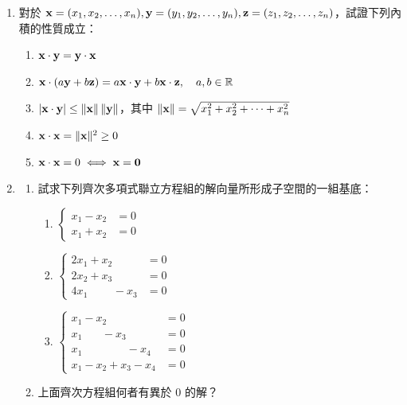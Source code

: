 \begin{enumerate}[label=\arabic*., leftmargin=2em]
  \item[\textbf{**9.}] 對於 $\boldsymbol{\mathbf{x}}=(x_1, x_2, \dots, x_n), \boldsymbol{\mathbf{y}}=(y_1, y_2, \dots, y_n), \boldsymbol{\mathbf{z}}=(z_1, z_2, \dots, z_n)$，試證下列內積的性質成立：
  \begin{enumerate}[label=(\roman*)]
    \item $\boldsymbol{\mathbf{x}} \cdot \boldsymbol{\mathbf{y}} = \boldsymbol{\mathbf{y}} \cdot \boldsymbol{\mathbf{x}}$
    \item $\boldsymbol{\mathbf{x}} \cdot (a\boldsymbol{\mathbf{y}} + b\boldsymbol{\mathbf{z}}) = a\boldsymbol{\mathbf{x}} \cdot \boldsymbol{\mathbf{y}} + b\boldsymbol{\mathbf{x}} \cdot \boldsymbol{\mathbf{z}}, \quad a, b \in \mathbb{R}$
    \item $|\boldsymbol{\mathbf{x}} \cdot \boldsymbol{\mathbf{y}}| \le \|\boldsymbol{\mathbf{x}}\| \, \|\boldsymbol{\mathbf{y}}\|$，其中 $\|\boldsymbol{\mathbf{x}}\| = \sqrt{x_1^2 + x_2^2 + \dots + x_n^2}$
    \item $\boldsymbol{\mathbf{x}} \cdot \boldsymbol{\mathbf{x}} = \|\boldsymbol{\mathbf{x}}\|^2 \ge 0$
    \item $\boldsymbol{\mathbf{x}} \cdot \boldsymbol{\mathbf{x}} = 0 \iff \boldsymbol{\mathbf{x}} = \boldsymbol{\mathbf{0}}$
  \end{enumerate}

  \item[\textbf{*10.}]
  \begin{enumerate}[label=(\alph*)]
    \item 試求下列齊次多項式聯立方程組的解向量所形成子空間的一組基底：
    \begin{enumerate}[label=(\roman*)]
      \item $\left\{\begin{aligned} x_1 - x_2 &= 0 \\ x_1 + x_2 &= 0 \end{aligned}\right.$
      \item $\left\{\begin{aligned}
      2x_1 + x_2 \phantom{+ x_3} &= 0 \\
      2x_2 + x_3 &= 0 \\
      4x_1 \phantom{+ 2x_2} - x_3 &= 0
      \end{aligned}\right.$
      \item $\left\{\begin{aligned}
      x_1 - x_2 \phantom{- x_3 - x_4} &= 0 \\
      x_1 \phantom{- x_2} - x_3 \phantom{- x_4} &= 0 \\
      x_1 \phantom{- x_2 - x_3} - x_4 &= 0 \\
      x_1 - x_2 + x_3 - x_4 &= 0
      \end{aligned}\right.$
    \end{enumerate}
    \item 上面齊次方程組何者有異於 0 的解？
  \end{enumerate}


\end{enumerate}
